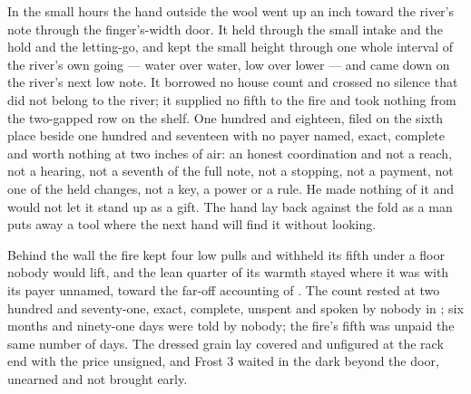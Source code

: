 \scenebreak

In the small hours the hand outside the wool went up an inch toward the river's note through the finger's-width door. It held through the small intake and the hold and the letting-go, and kept the small height through one whole interval of the river's own going --- water over water, low over lower --- and came down on the river's next low note. It borrowed no house count and crossed no silence that did not belong to the river; it supplied no fifth to the fire and took nothing from the two-gapped row on the shelf. One hundred and eighteen, filed on the sixth place beside one hundred and seventeen with no payer named, exact, complete and worth nothing at two inches of air: an honest coordination and not a reach, not a hearing, not a seventh of the full note, not a stopping, not a payment, not one of the held changes, not a key, a power or a rule. He made nothing of it and would not let it stand up as a gift. The hand lay back against the fold as a man puts away a tool where the next hand will find it without looking.

Behind the wall the fire kept four low pulls and withheld its fifth under a floor nobody would lift, and the lean quarter of its warmth stayed where it was with its payer unnamed, toward the far-off accounting of . The count rested at two hundred and seventy-one, exact, complete, unspent and spoken by nobody in ; six months and ninety-one days were told by nobody; the fire's fifth was unpaid the same number of days. The dressed grain lay covered and unfigured at the rack end with the price unsigned, and Frost 3 waited in the dark beyond the door, unearned and not brought early.

